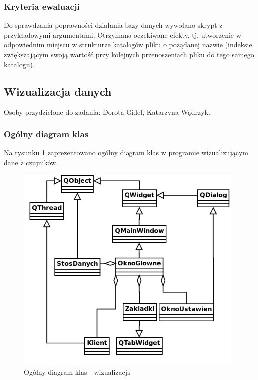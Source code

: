 ﻿\documentclass{article}
\begin{document}
\subsubsection{Kryteria ewaluacji}
Do sprawdzania poprawności działania bazy danych wywołano skrypt z przykładowymi argumentami. Otrzymano oczekiwane efekty, tj. utworzenie w odpowiednim miejscu w strukturze katalogów pliku o pożądanej nazwie (indeksie zwiększającym swoją wartość przy kolejnych przenoszeniach pliku do tego samego katalogu).

\subsection{Wizualizacja danych}
Osoby przydzielone do zadania: Dorota Gidel, Katarzyna Wądrzyk.

\subsubsection{Ogólny diagram klas}
Na rysunku \ref{rys:diagram_ogolny} zaprezentowano ogólny diagram klas w programie wizualizującym dane z czujników.
\begin{figure}[H]
    \centering
    \includegraphics[width=11cm]{diagram_ogolny.png}
    \caption{Ogólny diagram klas - wizualizacja}
    \label{rys:diagram_ogolny}
\end{figure}
\end{document}

